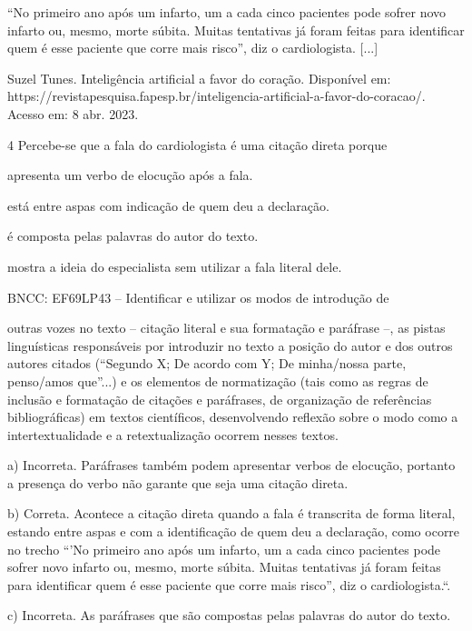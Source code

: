 \begin{escolha}
\begin{escolha}
\begin{escolha}
\begin{escolha}
\begin{escolha}
``No primeiro ano após um infarto, um a cada cinco pacientes pode sofrer
novo infarto ou, mesmo, morte súbita. Muitas tentativas já foram feitas
para identificar quem é esse paciente que corre mais risco'', diz o
cardiologista. {[}...{]}

Suzel Tunes. Inteligência artificial a favor do coração. Disponível em:
https://revistapesquisa.fapesp.br/inteligencia-artificial-a-favor-do-coracao/.
Acesso em: 8 abr. 2023.

\num {4} Percebe-se que a fala do cardiologista é uma citação direta
porque

\begin{escolha}
\item apresenta um verbo de elocução após a fala.

\item está entre aspas com indicação de quem deu a declaração.

\item é composta pelas palavras do autor do texto.

\item mostra a ideia do especialista sem utilizar a fala literal dele.

\end{escolha}BNCC: EF69LP43 -- Identificar e utilizar os modos de introdução de

outras vozes no texto -- citação literal e sua formatação e paráfrase
--, as pistas linguísticas responsáveis por introduzir no texto a
posição do autor e dos outros autores citados (``Segundo X; De acordo
com Y; De minha/nossa parte, penso/amos que''...) e os elementos de
normatização (tais como as regras de inclusão e formatação de citações e
paráfrases, de organização de referências bibliográficas) em textos
científicos, desenvolvendo reflexão sobre o modo como a
intertextualidade e a retextualização ocorrem nesses textos.

a) Incorreta. Paráfrases também podem apresentar verbos de elocução,
portanto a presença do verbo não garante que seja uma citação direta.

b) Correta. Acontece a citação direta quando a fala é transcrita de
forma literal, estando entre aspas e com a identificação de quem deu a
declaração, como ocorre no trecho ``'No primeiro ano após um infarto, um
a cada cinco pacientes pode sofrer novo infarto ou, mesmo, morte súbita.
Muitas tentativas já foram feitas para identificar quem é esse paciente
que corre mais risco'', diz o cardiologista.``.

c) Incorreta. As paráfrases que são compostas pelas palavras do autor do
texto.


\end{escolha}
\end{escolha}
\end{escolha}
\end{escolha}
\end{escolha}
